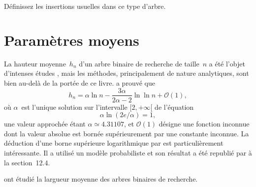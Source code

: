 Définissez les insertions usuelles dans ce type d'arbre.


\section{Paramètres moyens}

La hauteur moyenne~\(h_n\) d'un arbre binaire de recherche de
taille~\(n\) a été l'objet d'intenses études \citep{Devroye_1986,
  Devroye_1987, Mahmoud_1992, KnesslSpankowski_2002}, mais les
méthodes, principalement de nature analytiques, sont bien au-delà de
la portée de ce livre. \cite{Reed_2003} a prouvé que
\begin{equation*}
h_n = \alpha \ln n - \frac{3\alpha}{2\alpha - 2} \ln\ln n + \mathcal{O}(1),
\end{equation*}
où \(\alpha\)~est l'unique solution sur l'intervalle \([2,+\infty[\)
de l'équation
\begin{equation*}
\alpha\ln(2e/\alpha) = 1,
\end{equation*}
une valeur approchée étant \(\alpha \simeq 4.31107\), et
\(\mathcal{O}(1)\) désigne une fonction inconnue dont la valeur
absolue est bornée supérieurement par une constante inconnue. La
déduction d'une borne supérieure logarithmique par \cite{Aslam_2001}
est particulièrement intéressante. Il a utilisé un modèle probabiliste
et son résultat a été republié par \cite{CLRS_2009} à la section~12.4.

\cite{ChauvinDrmotaJabbour-Hattab_2001} ont étudié la largueur moyenne
des arbres binaires de recherche.
